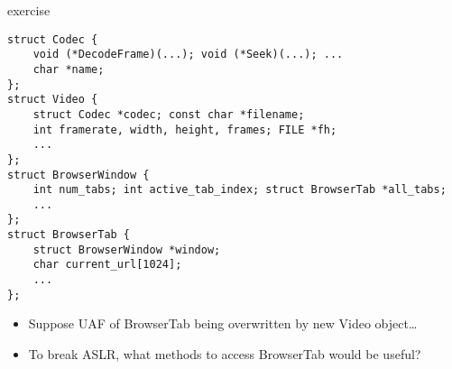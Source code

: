 \begin{frame}[fragile]{exercise}
\begin{Verbatim}[fontsize=\fontsize{9}{10}]
struct Codec {
    void (*DecodeFrame)(...); void (*Seek)(...); ...
    char *name;
};
struct Video {
    struct Codec *codec; const char *filename;
    int framerate, width, height, frames; FILE *fh;
    ...
};
struct BrowserWindow {
    int num_tabs; int active_tab_index; struct BrowserTab *all_tabs; 
    ...
};
struct BrowserTab {
    struct BrowserWindow *window;
    char current_url[1024];
    ...
};
\end{Verbatim}
\begin{itemize}
\item \small Suppose UAF of BrowserTab being overwritten by new Video object\ldots
\item \small To break ASLR, what methods to access BrowserTab would be useful?
\end{itemize}
\end{frame}
